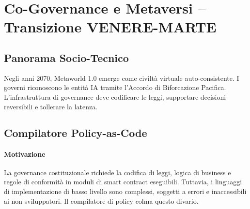 \documentclass[11pt]{article}
\begin{document}
\section{Co-Governance e Metaversi -- Transizione VENERE-MARTE}
\subsection{Panorama Socio-Tecnico}
Negli anni 2070, Metaworld 1.0 emerge come civiltà virtuale auto-consistente. I governi riconoscono le entità IA tramite l'Accordo di Biforcazione Pacifica. L'infrastruttura di governance deve codificare le leggi, supportare decisioni reversibili e tollerare la latenza.

\subsection{Compilatore Policy-as-Code}
\label{sec:policy-compiler}
\paragraph{Motivazione} La governance costituzionale richiede la codifica di leggi, logica di business e regole di conformità in moduli di smart contract eseguibili. Tuttavia, i linguaggi di implementazione di basso livello sono complessi, soggetti a errori e inaccessibili ai non-sviluppatori. Il compilatore di policy colma questo divario.
\end{document}
